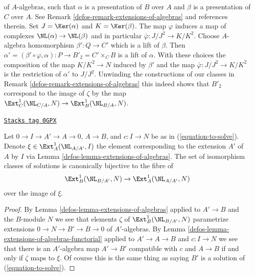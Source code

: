 \begin{remark}
$$$$
of $A$-algebras, such that $\alpha$ is a presentation of $B$ over $A$
and $\beta$ is a presentation of $C$ over $A$. See
Remark \ref{defos-remark-extensions-of-algebras} and references therein.
Set $J = \Ker(\alpha)$ and $K = \Ker(\beta)$. The map $\varphi$
induces a map of complexes $\NL(\alpha) \to \NL(\beta)$
and in particular $\bar\varphi : J/J^2 \to K/K^2$.
Choose $A$-algebra homomorphism $\beta' : Q \to C'$
which is a lift of $\beta$. Then
$\alpha' = (\beta' \circ \varphi, \alpha) : P \to B'_2 = C' \times_C B$
is a lift of $\alpha$. With these choices the composition of the map
$K/K^2 \to N$ induced by $\beta'$ and the map $\bar\varphi : J/J^2 \to K/K^2$
is the restriction of $\alpha'$ to $J/J^2$.
Unwinding the constructions of our classes in
Remark \ref{defos-remark-extensions-of-algebras}
this indeed shows that
$B'_2$ correspond to the image of $\zeta$ by the map
$\Ext^1_C(\NL_{C/A}, N) \to \Ext^1_B(\NL_{B/A}, N)$.
\end{remark}

\begin{lemma}
\label{defos-lemma-parametrize-solutions}
\href{https://stacks.math.columbia.edu/tag/0GPX}{\texttt{Stacks tag 0GPX}}

Let $0 \to I \to A' \to A \to 0$, $A \to B$, and $c : I \to N$ be as in
(\ref{equation-to-solve}). Denote $\xi \in \Ext^1_A(\NL_{A/A'}, I)$
the element corresponding to the extension $A'$ of $A$ by $I$ via
Lemma \ref{defos-lemma-extensions-of-algebras}. The set of isomorphism
classes of solutions is canonically bijective to the fibre of
$$
\Ext^1_B(\NL_{B/A'}, N) \to \Ext^1_A(\NL_{A/A'}, N)
$$
over the image of $\xi$.
\end{lemma}

\begin{proof}

By Lemma \ref{defos-lemma-extensions-of-algebras} applied to $A' \to B$ and
the $B$-module $N$ we see that elements $\zeta$ of $\Ext^1_B(\NL_{B/A'}, N)$
parametrize extensions $0 \to N \to B' \to B \to 0$ of $A'$-algebras.
By Lemma \ref{defos-lemma-extensions-of-algebras-functorial} applied
to $A' \to A \to B$ and $c : I \to N$ we see that there is an $A'$-algebra
map $A' \to B'$ compatible with $c$ and $A \to B$ if and only if
$\zeta$ maps to $\xi$. Of course this is the same thing as saying $B'$ is a
solution of (\ref{equation-to-solve}).
\end{proof}


